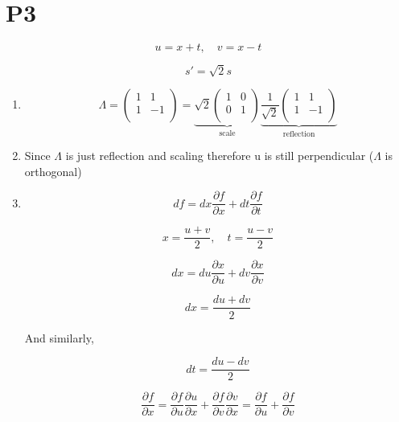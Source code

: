\documentclass[12pt]{article}
\begin{document}
\newpage

\section{P3}
\renewcommand{\labelenumi}{(\roman{enumi})}

\[
    u = x + t, \quad v = x - t
\]
 
\[
    s' = \sqrt{2}s
\]

\begin{enumerate}
    \item
          \[
              \Lambda = \begin{pmatrix}
                  1 & 1  \\
                  1 & -1 \\
              \end{pmatrix}
              =\underbrace{\sqrt{2} \begin{pmatrix}
                      1 & 0 \\
                      0 & 1 \\
                  \end{pmatrix}}_{\text{scale}} \underbrace{\frac{1}{\sqrt{2}}\begin{pmatrix}
                      1 & 1  \\
                      1 & -1 \\
                  \end{pmatrix}}_{\text{reflection}}
          \]
    \item
          Since $\Lambda$ is just reflection and scaling therefore u is still perpendicular ($\Lambda$ is orthogonal)
    \item
          \[
              df = dx \frac{\partial f}{\partial x}  + dt \frac{\partial f}{\partial t}
          \]

          \[
              x = \frac{u + v}{2},\quad t = \frac{u - v}{2}
          \]

          \[
              dx = du \frac{\partial x}{\partial u}  + dv \frac{\partial x}{\partial v}
          \]

          \[
              dx = \frac{du + dv}{2}
          \]

          And similarly,

          \[
              dt = \frac{du - dv}{2}
          \]

          \[
              \frac{\partial f}{\partial x}
              = \frac{\partial f}{\partial u} \frac{\partial u}{\partial x} + \frac{\partial f}{\partial v} \frac{\partial v}{\partial x}
              = \frac{\partial f}{\partial u} + \frac{\partial f}{\partial v}
          \]


\end{enumerate}
\end{document}
